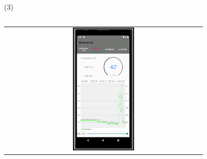 \begin{frame}{ (3)}
\begin{columns}
\begin{column}{0.60\textwidth}
\begin{center}
\begin{tabular}{c}
\includegraphics[width=0.32\textwidth]{2021_IoT_JoseRamon/figs/pantalla de temperatura.png}\\

          \end{tabular}
\end{center}
\end{column} 
\end{columns} 
\end{frame}



